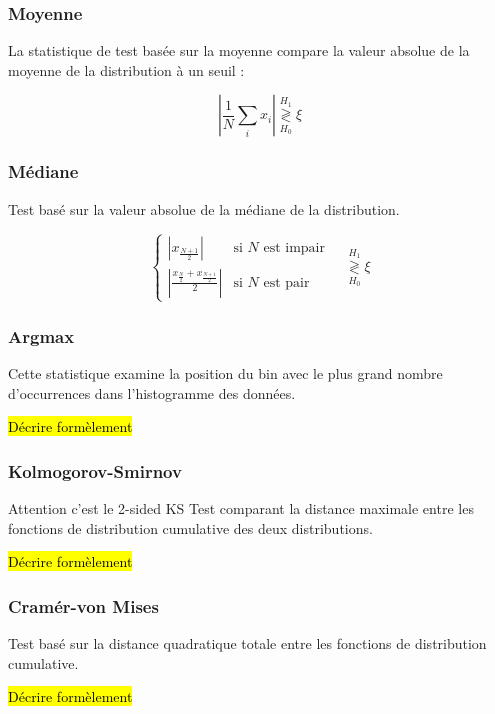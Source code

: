\documentclass{article}
\newcommand{\dm}[1]{{\color{mulberry} #1}}
\begin{document}
\subsubsection{Moyenne}

La statistique de test basée sur la moyenne compare la valeur absolue de la moyenne de la distribution à un seuil :

\begin{equation}
    \left|\frac{1}{N}\sum_i x_i \right| \stackrel{H_1}{\underset{H_0}{\gtrless}} \xi
\end{equation}

\subsubsection{Médiane}
Test basé sur la valeur absolue de la médiane de la distribution.

\begin{equation}
\begin{cases}
\left| x_{\frac{N+1}{2}} \right| & \text{si }N\text{ est impair} \\
\left| \frac{x_{\frac{N}{2}} + x_{\frac{N+1}{2}}}{2} \right|  & \text{si }N\text{ est pair}
\end{cases}
\quad\stackrel{H_1}{\underset{H_0}{\gtrless}} \xi
\end{equation}

\subsubsection{Argmax}
Cette statistique examine la position du bin avec le plus grand nombre d'occurrences dans l'histogramme des données.

\hl{Décrire formèlement}

\subsubsection{Kolmogorov-Smirnov}
\dm{Attention c'est le 2-sided KS}
Test comparant la distance maximale entre les fonctions de distribution cumulative des deux distributions.

\hl{Décrire formèlement}

\subsubsection{Cramér-von Mises}
Test basé sur la distance quadratique totale entre les fonctions de distribution cumulative.

\hl{Décrire formèlement}
\end{document}
